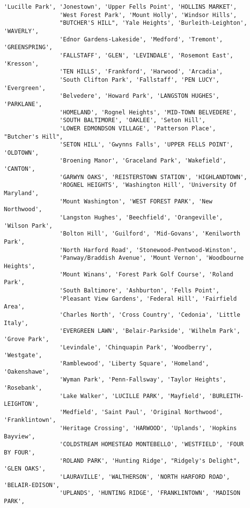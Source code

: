 \documentclass[11pt]{article}
\begin{document}
\begin{Verbatim}[commandchars=\\\{\}]
                'Lucille Park', 'Jonestown', 'Upper Fells Point', 'HOLLINS MARKET',
                'West Forest Park', 'Mount Holly', 'Windsor Hills',
                "BUTCHER'S HILL", 'Yale Heights', 'Burleith-Leighton', 'WAVERLY',
                'Ednor Gardens-Lakeside', 'Medford', 'Tremont', 'GREENSPRING',
                'FALLSTAFF', 'GLEN', 'LEVINDALE', 'Rosemont East', 'Kresson',
                'TEN HILLS', 'Frankford', 'Harwood', 'Arcadia',
                'South Clifton Park', 'Fallstaff', 'PEN LUCY', 'Evergreen',
                'Belvedere', 'Howard Park', 'LANGSTON HUGHES', 'PARKLANE',
                'HOMELAND', 'Rognel Heights', 'MID-TOWN BELVEDERE',
                'SOUTH BALTIMORE', 'OAKLEE', 'Seton Hill',
                'LOWER EDMONDSON VILLAGE', 'Patterson Place', "Butcher's Hill",
                'SETON HILL', 'Gwynns Falls', 'UPPER FELLS POINT', 'OLDTOWN',
                'Broening Manor', 'Graceland Park', 'Wakefield', 'CANTON',
                'GARWYN OAKS', 'REISTERSTOWN STATION', 'HIGHLANDTOWN',
                'ROGNEL HEIGHTS', 'Washington Hill', 'University Of Maryland',
                'Mount Washington', 'WEST FOREST PARK', 'New Northwood',
                'Langston Hughes', 'Beechfield', 'Orangeville', 'Wilson Park',
                'Bolton Hill', 'Guilford', 'Mid-Govans', 'Kenilworth Park',
                'North Harford Road', 'Stonewood-Pentwood-Winston',
                'Panway/Braddish Avenue', 'Mount Vernon', 'Woodbourne Heights',
                'Mount Winans', 'Forest Park Golf Course', 'Roland Park',
                'South Baltimore', 'Ashburton', 'Fells Point',
                'Pleasant View Gardens', 'Federal Hill', 'Fairfield Area',
                'Charles North', 'Cross Country', 'Cedonia', 'Little Italy',
                'EVERGREEN LAWN', 'Belair-Parkside', 'Wilhelm Park', 'Grove Park',
                'Levindale', 'Chinquapin Park', 'Woodberry', 'Westgate',
                'Ramblewood', 'Liberty Square', 'Homeland', 'Oakenshawe',
                'Wyman Park', 'Penn-Fallsway', 'Taylor Heights', 'Rosebank',
                'Lake Walker', 'LUCILLE PARK', 'Mayfield', 'BURLEITH-LEIGHTON',
                'Medfield', 'Saint Paul', 'Original Northwood', 'Franklintown',
                'Heritage Crossing', 'HARWOOD', 'Uplands', 'Hopkins Bayview',
                'COLDSTREAM HOMESTEAD MONTEBELLO', 'WESTFIELD', 'FOUR BY FOUR',
                'ROLAND PARK', 'Hunting Ridge', "Ridgely's Delight", 'GLEN OAKS',
                'LAURAVILLE', 'WALTHERSON', 'NORTH HARFORD ROAD', 'BELAIR-EDISON',
                'UPLANDS', 'HUNTING RIDGE', 'FRANKLINTOWN', 'MADISON PARK',

\end{Verbatim}
\end{document}
